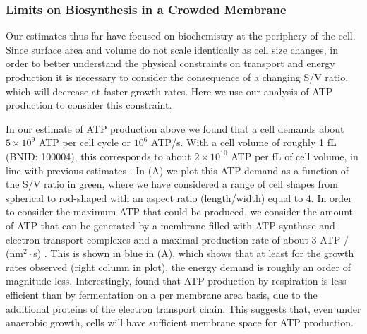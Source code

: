 \subsubsection{Limits on Biosynthesis in a Crowded Membrane}
Our estimates thus far have focused on biochemistry at the periphery of the cell.
Since surface area and volume do not scale identically as cell size changes,  in
order to better understand the physical constraints on transport and  energy
production it is necessary to consider the consequence of a changing S/V
ratio, which will decrease at faster growth rates. Here we use our analysis of
ATP production  to consider this constraint.

In our estimate of ATP production above we found that a cell demands about $5
\times 10^9$ ATP per cell cycle or $10^6$ ATP/s. With a cell volume of roughly 1
fL (BNID: 100004), this corresponds to about $2 \times 10^{10}$ ATP per fL of
cell volume, in line with previous estimates \citep{stouthamer1977, szenk2017}.
In  (A) we plot this ATP demand as a function of the S/V
ratio in green, where we have considered a range of cell shapes from spherical
to rod-shaped with an aspect ratio (length/width) equal to 4. In order to
consider the maximum ATP that could be produced, we consider the amount of ATP
that can be generated by a membrane filled with ATP synthase and electron
transport complexes and a maximal production rate of about 3 ATP / (nm$^2
\cdot$s) \citep{szenk2017}. This is shown in blue in (A),
which shows that at least for the growth rates observed (right column in plot),
the energy demand is roughly an order of magnitude less. Interestingly,
\cite{szenk2017} found that ATP production by respiration is less efficient than
by fermentation on a per membrane area basis, due to the additional proteins of
the electron transport chain. This suggests that, even under anaerobic growth,
cells will have sufficient membrane space for ATP production.

